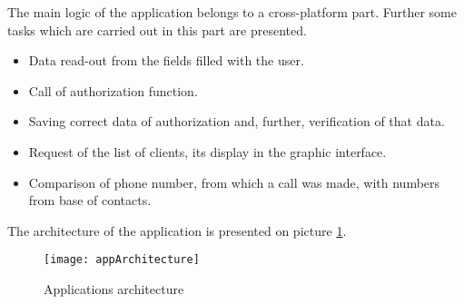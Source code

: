The main logic of the application belongs to a cross-platform part. Further some tasks which are carried out in this part are presented.

\begin {itemize}
\item Data read-out from the fields filled with the user.
\item Call of authorization function.
\item Saving correct data of authorization and, further, verification of that data.
\item Request of the list of clients, its display in the graphic interface.
\item Comparison of phone number, from which a call was made, with numbers from base of contacts.
\end {itemize}

The architecture of the application is presented on picture \ref {fig:appArchitecture}.

\begin{figure}[tbh]
\centering
\caption{Applications architecture}
\label{fig:appArchitecture}
\texttt{[image: appArchitecture]}
\end{figure}